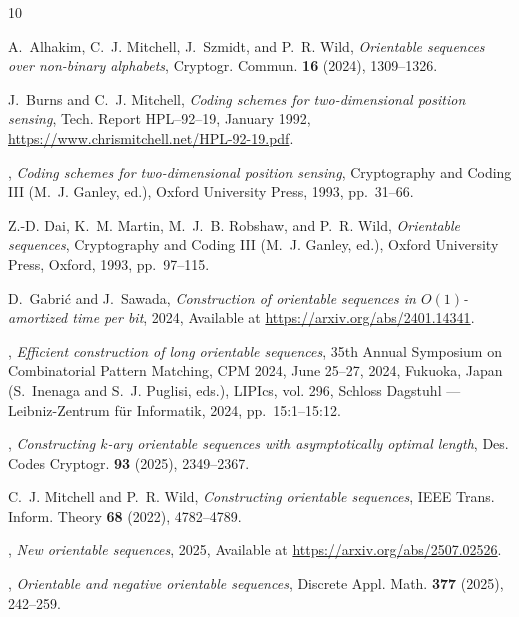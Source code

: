 \documentclass[a4paper,11pt]{article}
\theoremstyle{plain}
\theoremstyle{definition}
\theoremstyle{remark}
\begin{document}
\begin{thebibliography}{10}

 A.~Alhakim, C.~J. Mitchell, J.~Szmidt, and P.~R. Wild, \emph{Orientable
  sequences over non-binary alphabets}, Cryptogr. Commun. \textbf{16} (2024),
  1309--1326.

 J.~Burns and C.~J. Mitchell, \emph{Coding schemes for two-dimensional
    position
  sensing}, Tech. Report HPL--92--19, January 1992,
  \url{https://www.chrismitchell.net/HPL-92-19.pdf}.

 \bysame, \emph{Coding schemes for two-dimensional position sensing},
  Cryptography and Coding III (M.~J. Ganley, ed.), Oxford University Press,
  1993, pp.~31--66.

 Z.-D. Dai, K.~M. Martin, M.~J.~B. Robshaw, and P.~R. Wild, \emph{Orientable
  sequences}, Cryptography and Coding III (M.~J. Ganley, ed.), Oxford
  University Press, Oxford, 1993, pp.~97--115.

 D.~Gabri{\'c} and J.~Sawada, \emph{Construction of orientable sequences in
  {$O(1)$-amortized} time per bit}, 2024, Available at
  \url{https://arxiv.org/abs/2401.14341}.

 \bysame, \emph{Efficient construction of long orientable sequences}, 35th
  Annual Symposium on Combinatorial Pattern Matching, {CPM} 2024, June 25--27,
  2024, Fukuoka, Japan (S.~Inenaga and S.~J. Puglisi, eds.), LIPIcs, vol. 296,
  Schloss Dagstuhl --- Leibniz-Zentrum f{\"{u}}r Informatik, 2024,
  pp.~15:1--15:12.

 \bysame, \emph{Constructing $k$-ary orientable sequences with asymptotically
  optimal length}, Des. Codes Cryptogr. \textbf{93} (2025), 2349--2367.

 C.~J. Mitchell and P.~R. Wild, \emph{Constructing orientable sequences},
    IEEE
  Trans. Inform. Theory \textbf{68} (2022), 4782--4789.

 \bysame, \emph{New orientable sequences}, 2025, Available at
  \url{https://arxiv.org/abs/2507.02526}.

 \bysame, \emph{Orientable and negative orientable sequences}, Discrete
    Appl.
  Math. \textbf{377} (2025), 242--259.

\end{thebibliography}
\end{document}
